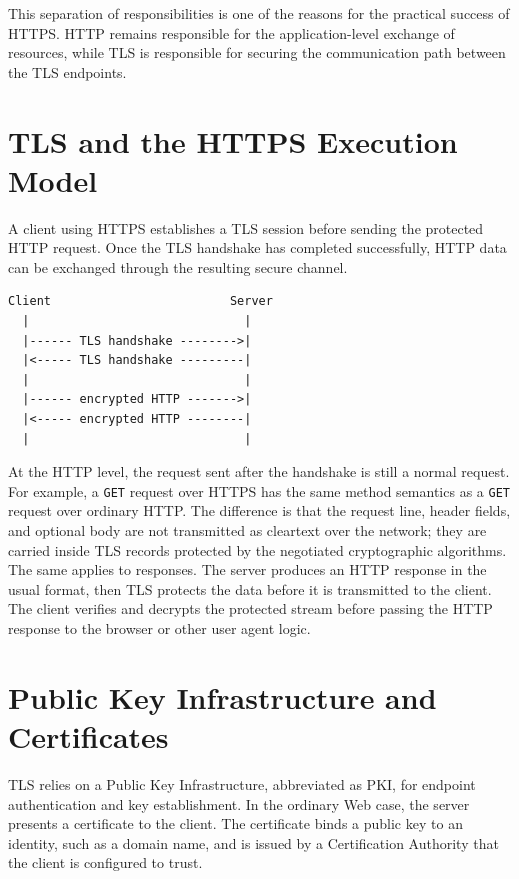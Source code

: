 \documentclass{scrbook}
\begin{document}
This separation of responsibilities is one of the reasons for the practical success of HTTPS. HTTP remains responsible for the application-level exchange of resources, while TLS is responsible for securing the communication path between the TLS endpoints.

\section{TLS and the HTTPS Execution Model}

A client using HTTPS establishes a TLS session before sending the protected HTTP request. Once the TLS handshake has completed successfully, HTTP data can be exchanged through the resulting secure channel.

\begin{lstlisting}
Client                         Server
  |                              |
  |------ TLS handshake -------->|
  |<----- TLS handshake ---------|
  |                              |
  |------ encrypted HTTP ------->|
  |<----- encrypted HTTP --------|
  |                              |
\end{lstlisting}

At the HTTP level, the request sent after the handshake is still a normal request. For example, a \texttt{GET} request over HTTPS has the same method semantics as a \texttt{GET} request over ordinary HTTP. The difference is that the request line, header fields, and optional body are not transmitted as cleartext over the network; they are carried inside TLS records protected by the negotiated cryptographic algorithms.\\

The same applies to responses. The server produces an HTTP response in the usual format, then TLS protects the data before it is transmitted to the client. The client verifies and decrypts the protected stream before passing the HTTP response to the browser or other user agent logic.

\section{Public Key Infrastructure and Certificates}

TLS relies on a Public Key Infrastructure, abbreviated as PKI, for endpoint authentication and key establishment. In the ordinary Web case, the server presents a certificate to the client. The certificate binds a public key to an identity, such as a domain name, and is issued by a Certification Authority that the client is configured to trust.\\
\end{document}
